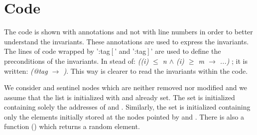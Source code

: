 





\chapter{Code}
\label{app:code}

The code is shown with annotations and not with line numbers in order to better understand the invariants.
%
These annotations are used to express the invariants. 
%
The lines of code wrapped by ':tag$\left[\right.$\;'  and ':tag$\left.\right]$\;' are used to define the preconditions of the invariants. 
%
In stead of: \textit{(\pc(i) $\leq$ n $\wedge$ \pc(i) $\geq$ m  $\to$ ...)} ; it is written: \textit{(@tag $\to$ )}.
%
This way is clearer to read the invariants within the code.


We consider \head and \tail sentinel nodes which are neither removed nor 
modified and we assume that the list is initialized with \head and \tail 
already set.
%
The set \region is initialized containing solely the addresses of \head 
and \tail.
%
Similarly, the set \elements is initialized containing only the elements 
initially stored at the nodes pointed by \head and \tail.
%
There is also a function () which returns a random element. 



